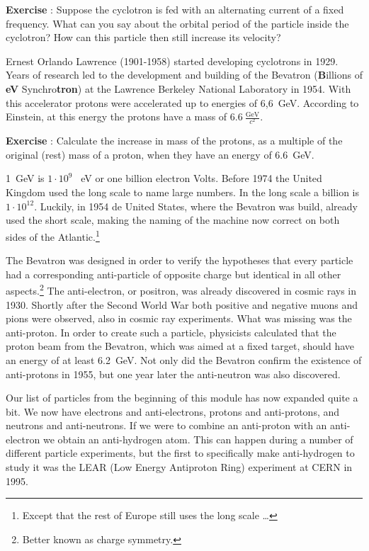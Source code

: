 \begin{shaded}
\textbf{Exercise \theExercise {}} : Suppose the cyclotron is fed with an alternating current of a fixed frequency. What can you say about the orbital period of the particle inside the cyclotron? How can this particle then still increase its velocity?\end{shaded}

Ernest Orlando Lawrence (1901-1958) started developing cyclotrons in 1929. Years of research led to the development and building of the Bevatron (\textbf{B}illions of \textbf{eV} Synchro\textbf{tron}) at the Lawrence Berkeley National Laboratory in 1954. With this accelerator protons were accelerated up to energies of 6,6~GeV. According to Einstein, at this energy the protons have a mass of $6.6~\frac{\mbox{GeV}}{c^2}$.

\begin{shaded}
\textbf{Exercise \theExercise {}} : Calculate the increase in mass of the protons, as a multiple of the original (rest) mass of a proton, when they have an energy of 6.6~GeV.\end{shaded}

1~GeV is $1 \cdot 10^9$~ eV or one billion electron Volts. Before 1974 the United Kingdom used the long scale to name large numbers. In the long scale a billion is $1 \cdot 10^{12}$. Luckily, in 1954 de United States, where the Bevatron was build, already used the short scale, making the naming of the machine now correct on both sides of the Atlantic.\footnote{Except that the rest of Europe still uses the long scale \ldots}

The Bevatron was designed in order to verify the hypotheses that every particle had a corresponding anti-particle of opposite charge but identical in all other aspects.\footnote{Better known as charge symmetry.}  The anti-electron, or positron, was already discovered in cosmic rays in 1930. Shortly after the Second World War both positive and negative muons and pions were observed, also in cosmic ray experiments. What was missing was the anti-proton. In order to create such a particle, physicists calculated that the proton beam from the Bevatron, which was aimed at a fixed target, should have an energy of at least 6.2~GeV. Not only did the Bevatron confirm the existence of anti-protons in 1955, but one year later the anti-neutron was also discovered.

Our list of particles from the beginning of this module has now expanded quite a bit. We now have electrons and anti-electrons, protons and anti-protons, and neutrons and anti-neutrons. If we were to combine an anti-proton with an anti-electron we obtain an anti-hydrogen atom. This can happen during a number of different particle experiments, but the first to specifically make anti-hydrogen to study it was the LEAR (Low Energy Antiproton Ring) experiment at CERN in 1995.


